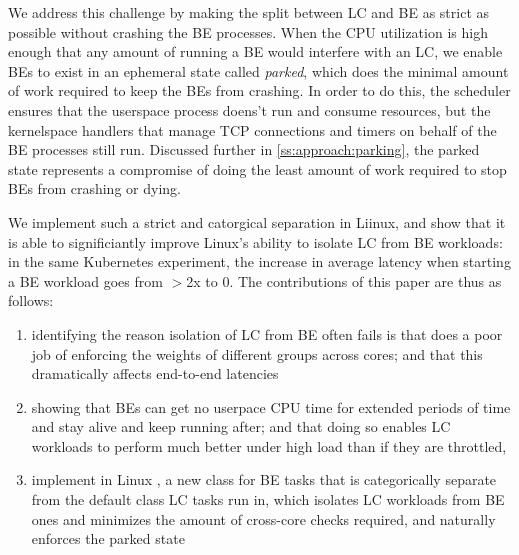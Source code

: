 We address this challenge by making the split between LC and BE as strict as
possible without crashing the BE processes. When the CPU utilization is high
enough that any amount of running a BE would interfere with an LC, we enable BEs
to exist in an ephemeral state called \textit{parked}, which does the minimal
amount of work required to keep the BEs from crashing. In order to do this, the
scheduler ensures that the userspace process doens't run and consume resources,
but the kernelspace handlers that manage TCP connections and timers on behalf of
the BE processes still run. Discussed further in \autoref{ss:approach:parking},
the parked state represents a compromise of doing the least amount of work
required to stop BEs from crashing or dying.

We implement such a strict and catorgical separation in Liinux, and show that it
is able to significiantly improve Linux's ability to isolate LC from BE
workloads: in the same Kubernetes experiment, the increase in average latency
when starting a BE workload goes from $>$2x to 0. The contributions of this
paper are thus as follows: 
\begin{enumerate}
    \item identifying the reason isolation of LC from BE often fails is that
    \cgroups{} does a poor job of enforcing the weights of different groups
    across cores; and that this dramatically affects end-to-end latencies
    \item showing that BEs can get no userpace CPU time for extended periods of
    time and stay alive and keep running after; and that doing so enables LC
    workloads to perform much better under high load than if they are throttled,
    \item implement in Linux \schedbe{}, a new class for BE tasks that is
    categorically separate from the default class LC tasks run in, which
    isolates LC workloads from BE ones and minimizes the amount of cross-core
    checks required, and naturally enforces the parked state
\end{enumerate}
